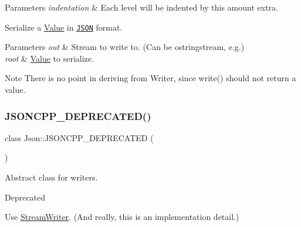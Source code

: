 \begin{DoxyParams}{Parameters}
{\em indentation} & Each level will be indented by this amount extra.\\
\hline
\end{DoxyParams}
Serialize a \hyperlink{classJson_1_1Value}{Value} in \href{http://www.json.org}{\tt J\+S\+ON} format. 
\begin{DoxyParams}{Parameters}
{\em out} & Stream to write to. (Can be ostringstream, e.\+g.) \\
\hline
{\em root} & \hyperlink{classJson_1_1Value}{Value} to serialize. \\
\hline
\end{DoxyParams}
\begin{DoxyNote}{Note}
There is no point in deriving from Writer, since write() should not return a value.
\end{DoxyNote}
\mbox{\label{namespaceJson_a677dd20047c0c6e4eb16c5f1b53f703c}} 
\subsubsection{\texorpdfstring{J\+S\+O\+N\+C\+P\+P\+\_\+\+D\+E\+P\+R\+E\+C\+A\+T\+E\+D()}{JSONCPP\_DEPRECATED()}\hspace{0.1cm}{\footnotesize\ttfamily [3/3]}}
{\footnotesize\ttfamily class Json\+::\+J\+S\+O\+N\+C\+P\+P\+\_\+\+D\+E\+P\+R\+E\+C\+A\+T\+ED (\begin{DoxyParamCaption}\item[{\char`\"{}Use \hyperlink{classJson_1_1StreamWriter}{Stream\+Writer} instead\char`\"{}}]{ }\end{DoxyParamCaption})}



Abstract class for writers. 

\begin{DoxyRefDesc}{Deprecated}
\item[\hyperlink{deprecated__deprecated000007}{Deprecated}]Use \hyperlink{classJson_1_1StreamWriter}{Stream\+Writer}. (And really, this is an implementation detail.) \end{DoxyRefDesc}
\mbox{\label{namespaceJson_a975d1dbca8aa7a06f38d373edcb9081c}} 
